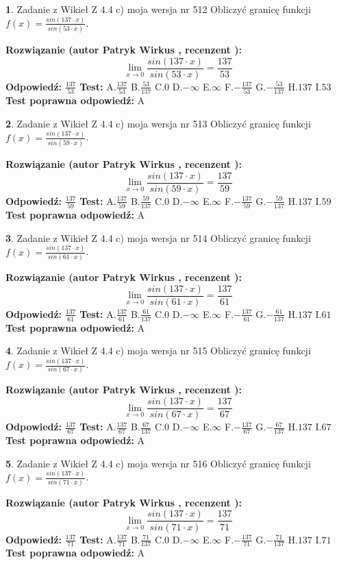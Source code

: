\documentclass[12pt, a4paper]{article}
\theoremstyle{definition} %
\newtheorem{zad}{}
\newcommand{\zadStart}[1]{\begin{zad}#1\newline}
\newcommand{\zadStop}{\end{zad}}
\newcommand{\rozwStart}[2]{\noindent \textbf{Rozwiązanie (autor #1 , recenzent #2): }\newline}
\newcommand{\rozwStop}{\newline}
\newcommand{\odpStart}{\noindent \textbf{Odpowiedź:}\newline}
\newcommand{\odpStop}{\newline}
\newcommand{\testStart}{\noindent \textbf{Test:}\newline}
\newcommand{\testStop}{\newline}
\newcommand{\kluczStart}{\noindent \textbf{Test poprawna odpowiedź:}\newline}
\newcommand{\kluczStop}{\newline}
\begin{document}
\zadStart{Zadanie z Wikieł Z 4.4 c) moja wersja nr 512}
Obliczyć granicę funkcji $f(x)=\frac{sin(137\cdot x)}{sin(53\cdot x)}$.
\zadStop
\rozwStart{Patryk Wirkus}{}
$$\lim\limits_{x\to 0}\frac{sin(137\cdot x)}{sin(53\cdot x)}=
\frac{137}{53}$$
\rozwStop
\odpStart
$\frac{137}{53}$
\odpStop
\testStart
A.$\frac{137}{53}$
B.$\frac{53}{137}$
C.$0$
D.$-\infty$
E.$\infty$
F.$-\frac{137}{53}$
G.$-\frac{53}{137}$
H.$137$
I.$53$
\testStop
\kluczStart
A
\kluczStop



\zadStart{Zadanie z Wikieł Z 4.4 c) moja wersja nr 513}
Obliczyć granicę funkcji $f(x)=\frac{sin(137\cdot x)}{sin(59\cdot x)}$.
\zadStop
\rozwStart{Patryk Wirkus}{}
$$\lim\limits_{x\to 0}\frac{sin(137\cdot x)}{sin(59\cdot x)}=
\frac{137}{59}$$
\rozwStop
\odpStart
$\frac{137}{59}$
\odpStop
\testStart
A.$\frac{137}{59}$
B.$\frac{59}{137}$
C.$0$
D.$-\infty$
E.$\infty$
F.$-\frac{137}{59}$
G.$-\frac{59}{137}$
H.$137$
I.$59$
\testStop
\kluczStart
A
\kluczStop



\zadStart{Zadanie z Wikieł Z 4.4 c) moja wersja nr 514}
Obliczyć granicę funkcji $f(x)=\frac{sin(137\cdot x)}{sin(61\cdot x)}$.
\zadStop
\rozwStart{Patryk Wirkus}{}
$$\lim\limits_{x\to 0}\frac{sin(137\cdot x)}{sin(61\cdot x)}=
\frac{137}{61}$$
\rozwStop
\odpStart
$\frac{137}{61}$
\odpStop
\testStart
A.$\frac{137}{61}$
B.$\frac{61}{137}$
C.$0$
D.$-\infty$
E.$\infty$
F.$-\frac{137}{61}$
G.$-\frac{61}{137}$
H.$137$
I.$61$
\testStop
\kluczStart
A
\kluczStop



\zadStart{Zadanie z Wikieł Z 4.4 c) moja wersja nr 515}
Obliczyć granicę funkcji $f(x)=\frac{sin(137\cdot x)}{sin(67\cdot x)}$.
\zadStop
\rozwStart{Patryk Wirkus}{}
$$\lim\limits_{x\to 0}\frac{sin(137\cdot x)}{sin(67\cdot x)}=
\frac{137}{67}$$
\rozwStop
\odpStart
$\frac{137}{67}$
\odpStop
\testStart
A.$\frac{137}{67}$
B.$\frac{67}{137}$
C.$0$
D.$-\infty$
E.$\infty$
F.$-\frac{137}{67}$
G.$-\frac{67}{137}$
H.$137$
I.$67$
\testStop
\kluczStart
A
\kluczStop



\zadStart{Zadanie z Wikieł Z 4.4 c) moja wersja nr 516}
Obliczyć granicę funkcji $f(x)=\frac{sin(137\cdot x)}{sin(71\cdot x)}$.
\zadStop
\rozwStart{Patryk Wirkus}{}
$$\lim\limits_{x\to 0}\frac{sin(137\cdot x)}{sin(71\cdot x)}=
\frac{137}{71}$$
\rozwStop
\odpStart
$\frac{137}{71}$
\odpStop
\testStart
A.$\frac{137}{71}$
B.$\frac{71}{137}$
C.$0$
D.$-\infty$
E.$\infty$
F.$-\frac{137}{71}$
G.$-\frac{71}{137}$
H.$137$
I.$71$
\testStop
\kluczStart
A
\kluczStop
\end{document}

